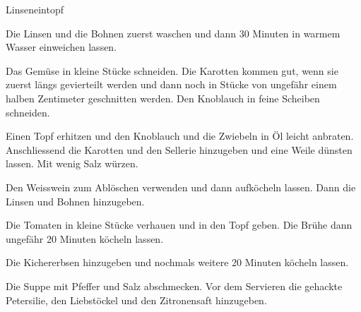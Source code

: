 
\begin{recipe}[]{Linseneintopf}{}{}



\step
Die Linsen und die Bohnen zuerst waschen und dann 30 Minuten in warmem Wasser einweichen lassen.

\step
Das Gem\"use in kleine St\"ucke schneiden. Die Karotten kommen gut, wenn sie zuerst l\"angs gevierteilt werden und dann noch in St\"ucke von ungef\"ahr einem halben Zentimeter geschnitten werden. Den Knoblauch in feine Scheiben schneiden.

\step
Einen Topf erhitzen und den Knoblauch und die Zwiebeln in \"Ol leicht anbraten. Anschliessend die Karotten und den Sellerie hinzugeben und eine Weile d\"unsten lassen. Mit wenig Salz w\"urzen.

\step
Den Weisswein zum Abl\"oschen verwenden und dann aufk\"ocheln lassen. Dann die Linsen und Bohnen hinzugeben.

\step
Die Tomaten in kleine St\"ucke verhauen und in den Topf geben. Die Br\"uhe dann ungef\"ahr 20 Minuten k\"ocheln lassen.

\step
Die Kichererbsen hinzugeben und nochmals weitere 20 Minuten k\"ocheln lassen.

\step
Die Suppe mit Pfeffer und Salz abschmecken. Vor dem Servieren die gehackte Petersilie, den Liebst\"ockel und den Zitronensaft hinzugeben.


\end{recipe}